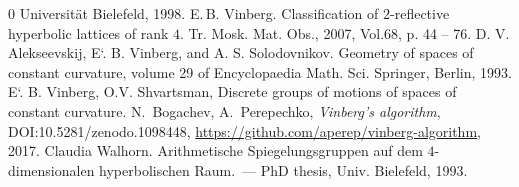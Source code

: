 \documentclass[reqno,12pt]{amsart}
\newcounter{z}
\begin{document}
\begin{thebibliography}{0}
Universität Bielefeld, 1998.
E.\,B. Vinberg. Classification of $2$-reflective hyperbolic lattices of rank $4$. Tr. Mosk. Mat. Obs., 2007,  Vol.68, p. 44 -- 76.
D. V. Alekseevskij, E`. B. Vinberg, and A. S. Solodovnikov. Geometry of spaces of constant curvature, volume 29 of Encyclopaedia Math. Sci. Springer, Berlin, 1993.
E`. B. Vinberg, O.V. Shvartsman, Discrete groups of motions of spaces of constant curvature.
N.~Bogachev, A.~Perepechko, \textit{Vinberg's algorithm}, DOI:10.5281/zenodo.1098448,
	\url{https://github.com/aperep/vinberg-algorithm}, 2017.
Claudia Walhorn. Arithmetische Spiegelungsgruppen auf dem 
$4$-dimensionalen hyperbolischen Raum.~--- PhD thesis, Univ. Bielefeld, 1993.
\end{thebibliography}
\end{document}

